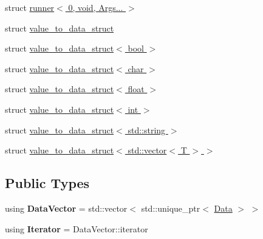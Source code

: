 \begin{DoxyCompactItemize}
\item 
struct \hyperlink{structcreek_1_1_resolver_1_1runner_3_010_00_01void_00_01_args_8_8_8_01_4}{runner$<$ 0, void, Args... $>$}
\item 
struct \hyperlink{structcreek_1_1_resolver_1_1value__to__data__struct}{value\+\_\+to\+\_\+data\+\_\+struct}
\item 
struct \hyperlink{structcreek_1_1_resolver_1_1value__to__data__struct_3_01bool_01_4}{value\+\_\+to\+\_\+data\+\_\+struct$<$ bool $>$}
\item 
struct \hyperlink{structcreek_1_1_resolver_1_1value__to__data__struct_3_01char_01_4}{value\+\_\+to\+\_\+data\+\_\+struct$<$ char $>$}
\item 
struct \hyperlink{structcreek_1_1_resolver_1_1value__to__data__struct_3_01float_01_4}{value\+\_\+to\+\_\+data\+\_\+struct$<$ float $>$}
\item 
struct \hyperlink{structcreek_1_1_resolver_1_1value__to__data__struct_3_01int_01_4}{value\+\_\+to\+\_\+data\+\_\+struct$<$ int $>$}
\item 
struct \hyperlink{structcreek_1_1_resolver_1_1value__to__data__struct_3_01std_1_1string_01_4}{value\+\_\+to\+\_\+data\+\_\+struct$<$ std\+::string $>$}
\item 
struct \hyperlink{structcreek_1_1_resolver_1_1value__to__data__struct_3_01std_1_1vector_3_01_t_01_4_01_4}{value\+\_\+to\+\_\+data\+\_\+struct$<$ std\+::vector$<$ T $>$ $>$}
\end{DoxyCompactItemize}
\subsection*{Public Types}
\begin{DoxyCompactItemize}
\item 
using {\bfseries Data\+Vector} = std\+::vector$<$ std\+::unique\+\_\+ptr$<$ \hyperlink{classcreek_1_1_data}{Data} $>$ $>$\hypertarget{structcreek_1_1_resolver_a671f67c35342e52a8e34031ca8fae444}{}\label{structcreek_1_1_resolver_a671f67c35342e52a8e34031ca8fae444}

\item 
using {\bfseries Iterator} = Data\+Vector\+::iterator\hypertarget{structcreek_1_1_resolver_aef4666c716334ba950c6bd947ac52e7f}{}\label{structcreek_1_1_resolver_aef4666c716334ba950c6bd947ac52e7f}

\end{DoxyCompactItemize}
